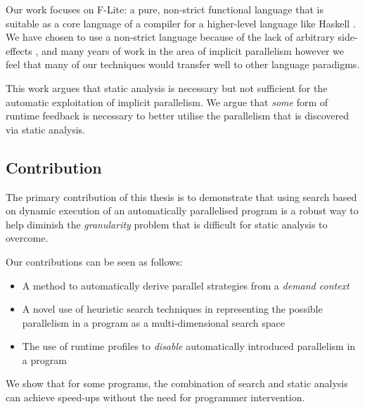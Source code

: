 Our work focuses on F-Lite: a pure, non-strict functional language that is
suitable as a core language of a compiler for a higher-level language like
Haskell \citep{naylor2010reduceron}. We have chosen to use a non-strict language
because of the lack of arbitrary side-effects \citep{whyFPmatters}, and many
years of work in the area of implicit parallelism \citep{hogen1992automatic,
PFPAnIntro, jones1993implicit} however we feel that many of our techniques
would transfer well to other language paradigms.

This work argues that static analysis is necessary but not sufficient for the
automatic exploitation of implicit parallelism. We argue that \emph{some} form
of runtime feedback is necessary to better utilise the parallelism that is
discovered via static analysis.

\subsection{Contribution}

The primary contribution of this thesis is to demonstrate that using search
based on dynamic execution of an automatically parallelised program is a robust
way to help diminish the \emph{granularity} problem that is difficult for
static analysis to overcome.

Our contributions can be seen as follows:

\begin{itemize}
    \item A method to automatically derive parallel strategies from a
            \emph{demand context}
    \item A novel use of heuristic search techniques in representing the
            possible parallelism in a program as a multi-dimensional search space
    \item The use of runtime profiles to \emph{disable} automatically introduced
            parallelism in a program
\end{itemize}

We show that for some programs, the combination of
search and static analysis can achieve speed-ups without the need for
programmer intervention.

